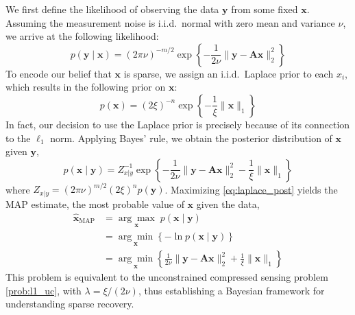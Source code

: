 \documentclass[final,5p,times,twocolumn]{elsarticle}
\newcommand{\m}[1]{\boldsymbol{#1}}
\begin{document}
We first define the likelihood of observing the data $\m{y}$ from some
fixed $\m{x}$. Assuming the measurement noise is i.i.d.~normal with
zero mean and variance $\nu$, we arrive at the following likelihood:
\begin{equation}
p(\m{y} \mid \m{x}) =
 (2 \pi \nu)^{-m/2} \exp\left\{
  -\frac{1}{2 \nu} \| \m{y} - \m{A} \m{x} \|_2^2
 \right\}
\label{eq:likelihood}
\end{equation}
To encode our belief that $\m{x}$ is sparse, we assign an i.i.d.~Laplace
prior to each $x_i$, which results in the following prior on $\m{x}$:
\begin{equation}
p(\m{x}) =
 (2 \xi)^{-n} \exp\left\{
  -\frac{1}{\xi} \| \m{x} \|_1
 \right\}
\label{eq:laplace_prior}
\end{equation}
In fact, our decision to use the Laplace prior is precisely because of
its connection to the $\ell_1$ norm. Applying Bayes' rule, we obtain
the posterior distribution of $\m{x}$ given $\m{y}$,
\begin{equation}
p(\m{x} \mid \m{y}) =
 Z_{x|y}^{-1} \exp\left\{
  -\frac{1}{2 \nu} \| \m{y} - \m{A} \m{x} \|_2^2
  -\frac{1}{\xi} \| \m{x} \|_1
 \right\}
\label{eq:laplace_post}
\end{equation}
where $Z_{x|y} = (2 \pi \nu)^{m/2} (2 \xi)^n p(\m{y})$. Maximizing
\eqref{eq:laplace_post} yields the MAP estimate, the most probable
value of $\m{x}$ given the data,
\begin{equation}
\begin{aligned}
\m{\hat x}_{\text{MAP}} &=
 \underset{\m{x}}{\arg\max} \; p(\m{x} \mid \m{y})
\\ &=
 \underset{\m{x}}{\arg\min} \left\{ -\ln p(\m{x} \mid \m{y}) \right\}
\\ &=
 \underset{\m{x}}{\arg\min} \left\{
  \frac{1}{2 \nu} \| \m{y} - \m{A} \m{x} \|_2^2 +
  \frac{1}{\xi} \| \m{x} \|_1
 \right\}
\end{aligned}
\label{prob:laplace_map}
\end{equation}
This problem is equivalent to the unconstrained compressed sensing
problem \eqref{prob:l1_uc}, with $\lambda = \xi / (2 \nu)$, thus
establishing a Bayesian framework for understanding sparse recovery.
\end{document}
